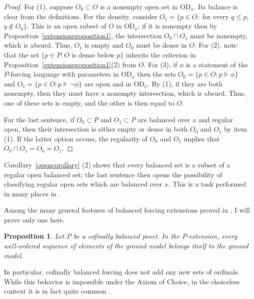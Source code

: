 \documentclass{article}
\newcommand{\vd}{\mathrm{OD}}
\newtheorem{proposition}[theorem]{Proposition}
\theoremstyle{definition}
\begin{document}
\begin{proof}
For (1), suppose $O_0\subset O$ is a nonempty open set in $\vd_x$. Its balance is clear from the definitions. For the density, consider $O_1=\{p\in O\colon$ for every $q\leq p$, $q\notin O_0\}$. This is an open subset of $O$ in $\vd_x$; if it is nonempty then by Proposition~\ref{extensionproposition1}, the intersection $O_0\cap O_1$ must be nonempty, which is absurd. Thus, $O_1$ is empty and $O_0$ must be dense in $O$. For (2), note that the set $\{p\in P\colon O$ is dense below $p\}$ inherits the criterion in Proposition~\ref{extensionproposition1}(2) from $O$. For (3), if $\phi$ is a statement of the $P$-forcing language with parameters in $\vd_x$ then the sets $O_0=\{p\in O\colon p\Vdash\phi\}$ and $O_1=\{p\in O\colon p\Vdash\lnot\phi\}$ are open and in $\vd_x$. By (1), if they are both nonempty, then they must have a nonempty intersection, which is absurd. Thus, one of these sets is empty, and the other is then equal to $O$.

For the last sentence, if $O_0\subset P$ and $O_1\subset P$ are balanced over $x$ and regular open, then their intersection is either empty or dense in both $O_0$ and $O_1$ by item (1). If the latter option occurs, the regularity of $O_0$ and $O_1$ implies that $O_0\cap O_1=O_0=O_1$.
\end{proof}


\noindent Corollary~\ref{opencorollary} (2) shows that every balanced set is a subset of a regular open balanced set; the last sentence then opens the possibility of classifying regular open sets which are balanced over $x$. This is a task performed in many places in \cite{z:geometric}. 

Among the many general features of balanced forcing extensions proved in \cite{z:geometric}, I will prove only one here.

\begin{proposition}
Let $P$ be a cofinally balanced poset. In the $P$-extension, every well-ordered sequence of elements of the ground model belongs itself to the ground model.
\end{proposition}

\noindent In particular, cofinally balanced forcing does not add any new sets of ordinals. While this behavior is impossible under the Axiom of Choice, in the choiceless context it is in fact quite common \cite{mathias:barren, dobrinen:barren}.
\end{document}
